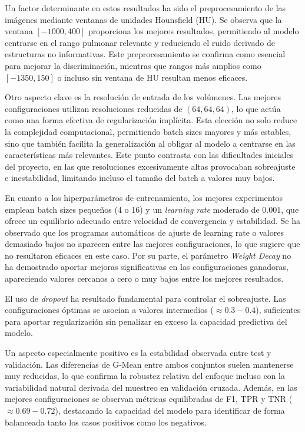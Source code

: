 Un factor determinante en estos resultados ha sido el preprocesamiento de las imágenes mediante ventanas de unidades Hounsfield (HU). Se observa que la ventana $[-1000,400]$ proporciona los mejores resultados, permitiendo al modelo centrarse en el rango pulmonar relevante y reduciendo el ruido derivado de estructuras no informativas. Este preprocesamiento se confirma como esencial para mejorar la discriminación, mientras que rangos más amplios como $[-1350,150]$  o incluso sin ventana de HU resultan menos eficaces.

Otro aspecto clave es la resolución de entrada de los volúmenes. Las mejores configuraciones utilizan resoluciones reducidas de $(64,64,64)$, lo que actúa como una forma efectiva de regularización implícita. Esta elección no solo reduce la complejidad computacional, permitiendo batch sizes mayores y más estables, sino que también facilita la generalización al obligar al modelo a centrarse en las características más relevantes. Este punto contrasta con las dificultades iniciales del proyecto, en las que resoluciones excesivamente altas provocaban sobreajuste e inestabilidad, limitando incluso el tamaño del batch a valores muy bajos.

En cuanto a los hiperparámetros de entrenamiento, los mejores experimentos emplean batch sizes pequeños (4 o 16) y un \textit{learning rate} moderado de $0.001$, que ofrece un equilibrio adecuado entre velocidad de convergencia y estabilidad. Se ha observado que los programas automáticos de ajuste de learning rate o valores demasiado bajos no aparecen entre las mejores configuraciones, lo que sugiere que no resultaron eficaces en este caso. Por su parte, el parámetro \textit{Weight Decay} no ha demostrado aportar mejoras significativas en las configuraciones ganadoras, apareciendo valores cercanos a cero o muy bajos entre los mejores resultados.

El uso de \textit{dropout} ha resultado fundamental para controlar el sobreajuste. Las configuraciones óptimas se asocian a valores intermedios ($\approx 0.3-0.4$), suficientes para aportar regularización sin penalizar en exceso la capacidad predictiva del modelo.

Un aspecto especialmente positivo es la estabilidad observada entre test y validación. Las diferencias de G-Mean entre ambos conjuntos suelen mantenerse muy reducidas, lo que confirma la robustez relativa del enfoque incluso con la variabilidad natural derivada del muestreo en validación cruzada. Además, en las mejores configuraciones se observan métricas equilibradas de F1, TPR y TNR ($\approx 0.69-0.72$), destacando la capacidad del modelo para identificar de forma balanceada tanto los casos positivos como los negativos.

